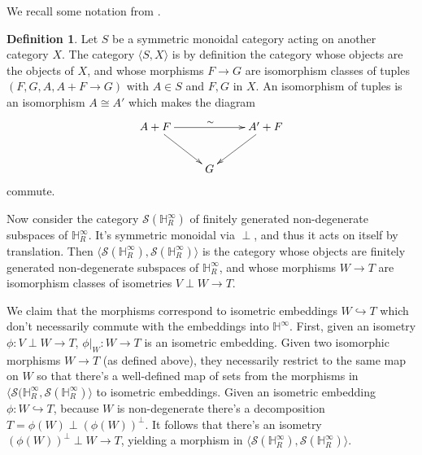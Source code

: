\documentclass[draftthesis,tocnosub,noragright,centerchapter,10pt]{uiucthesis2009}
\newcommand{\mbb}{\mathbb}
\newcommand{\mc}{\mathcal}
\theoremstyle{plain}
\theoremstyle{definition}
\newtheorem{definition}[lemma]{Definition}
\begin{document}
We recall some notation from \cite{Gra76}.

\begin{definition}
Let $S$ be a symmetric monoidal category acting on another category
$X$. The category $\langle S, X\rangle$ is by definition the category
whose objects are the objects of $X$, and whose morphisms $F
\rightarrow G$ are
isomorphism classes of tuples $(F,G,A,A+F \rightarrow G)$ with $A \in
S$ and $F,G$ in $X$. An isomorphism of tuples is an isomorphism $A
\cong A'$ which makes the diagram
\[
\xymatrix{A+F \ar[rr]^{\sim} \ar[dr]&& A' + F \ar[dl] \\ &G&}
\]
commute.
\end{definition}

Now consider the category $\mc S(\mbb H_R^\infty)$ of finitely generated
non-degenerate subspaces of $\mbb H_R^\infty$. It's symmetric monoidal
via $\perp$, and thus it acts on itself by translation. Then $\langle
\mc S(\mbb H_R^\infty), \mc S(\mbb H_R^\infty) \rangle$ is the category
whose objects are finitely generated non-degenerate subspaces of $\mbb
H_R^\infty$, and whose morphisms $W \rightarrow T$ are isomorphism classes of isometries
$V \perp W \rightarrow T$. 

We claim that the morphisms correspond to
isometric embeddings $W \hookrightarrow T$ which don't necessarily
commute with the embeddings into  $\mbb H^\infty$. First, given an isometry
$\phi : V \perp W \rightarrow T$,  $\phi|_W : W \rightarrow T$ is an
isometric embedding. Given two isomorphic morphisms $W \rightarrow T$
(as defined above), they necessarily
restrict to the same map on $W$ so that there's a well-defined map of
sets from the morphisms in $\langle
\mc S(\mbb H_R^\infty, \mc S(\mbb H_R^\infty)\rangle$ to isometric
embeddings. Given an isometric embedding $\phi : W \hookrightarrow T$,
because $W$ is non-degenerate there's a decomposition $T = \phi(W)
\perp (\phi(W))^\perp$. It follows that there's an isometry 
$(\phi(W))^\perp \perp W \rightarrow T$, yielding a morphism in $\langle
\mc S(\mbb H_R^\infty), \mc S(\mbb H_R^\infty) \rangle$.
\end{document}
